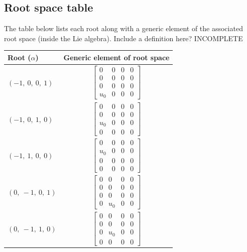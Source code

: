 \documentclass[11pt]{article}
\newcommand{\noi}{\noindent}
\theoremstyle{definition}
\begin{document}
\subsection{Root space table}

\noi The table below lists each root along with a generic element of the associated root space (inside the Lie algebra). Include a definition here? INCOMPLETE

\bigskip

\noindent \begin{tabular}{|l|c|}
    \hline
    \textbf{Root ($\alpha$)} & \textbf{Generic element of root space} \\
    \hline
    $\left( -1, \  0, \  0, \  1\right)$ & $\left[\begin{matrix}0 & 0 & 0 & 0\\0 & 0 & 0 & 0\\0 & 0 & 0 & 0\\u_{0} & 0 & 0 & 0\end{matrix}\right]$ \\
    \hline
    $\left( -1, \  0, \  1, \  0\right)$ & $\left[\begin{matrix}0 & 0 & 0 & 0\\0 & 0 & 0 & 0\\u_{0} & 0 & 0 & 0\\0 & 0 & 0 & 0\end{matrix}\right]$ \\
    \hline
    $\left( -1, \  1, \  0, \  0\right)$ & $\left[\begin{matrix}0 & 0 & 0 & 0\\u_{0} & 0 & 0 & 0\\0 & 0 & 0 & 0\\0 & 0 & 0 & 0\end{matrix}\right]$ \\
    \hline
    $\left( 0, \  -1, \  0, \  1\right)$ & $\left[\begin{matrix}0 & 0 & 0 & 0\\0 & 0 & 0 & 0\\0 & 0 & 0 & 0\\0 & u_{0} & 0 & 0\end{matrix}\right]$ \\
    \hline
    $\left( 0, \  -1, \  1, \  0\right)$ & $\left[\begin{matrix}0 & 0 & 0 & 0\\0 & 0 & 0 & 0\\0 & u_{0} & 0 & 0\\0 & 0 & 0 & 0\end{matrix}\right]$ \\

\end{tabular}
\end{document}
